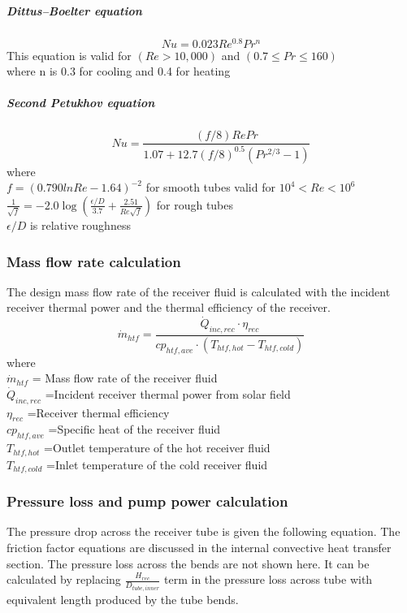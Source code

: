 \subparagraph{Dittus–Boelter equation \cite{Cengel.2003}}
\begin{equation}
Nu=0.023 Re^{0.8}Pr^n
\end{equation}
This equation is valid for $\left( Re > 10,000\right)$  and $\left(0.7\le Pr \le 160 \right)$ \\
where n is 0.3 for cooling and 0.4 for heating

\subparagraph{Second Petukhov equation \cite{Cengel.2003}}
\begin{equation}
Nu= \frac{(f/8)RePr}{1.07+12.7(f/8)^{0.5}(Pr^{2/3}-1)}
\end{equation}
where\\ 
$f = (0.790lnRe-1.64)^{-2}$ for smooth tubes valid for $10^4<Re<10^6 $\\
$ \frac{1}{\sqrt{f}}=-2.0\log{\left(\frac{\epsilon/D}{3.7}+\frac{2.51}{Re\sqrt{f}}\right)}$ for rough tubes \\
$\epsilon/D $ is relative roughness

\subsubsection{ Mass flow rate calculation}
The design mass flow rate of the receiver fluid is calculated with the incident receiver thermal power and the thermal efficiency of the receiver.
\begin{equation}
\dot m_{htf}= \frac{\dot Q_{inc,rec}\cdot \eta_{rec}}{cp_{htf,ave}\cdot (T_{htf,hot}-T_{htf,cold})}
\end{equation}
where\\ 
$\dot m_{htf}$ = Mass flow rate of the receiver fluid \\
$\dot Q_{inc,rec}$ =Incident receiver thermal power from solar field \\
$\eta_{rec}$ =Receiver thermal efficiency \\
$cp_{htf,ave}$ =Specific heat of the receiver fluid \\
$T_{htf,hot}$ =Outlet temperature of the hot receiver fluid \\
$T_{htf,cold}$ =Inlet temperature of the cold receiver fluid \\

\subsubsection{Pressure loss and pump power calculation}
The pressure drop across the receiver tube is given the following equation. The friction factor equations are discussed in the internal convective heat transfer section. The pressure loss across the bends are not shown here. It can be calculated by replacing $ \frac{H_{rec}}{D_{tube,inner}} $ term in the pressure loss across tube with equivalent length produced by the tube bends.

